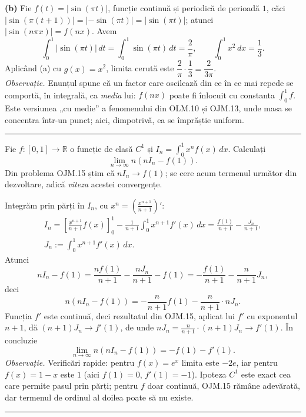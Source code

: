 \noindent\textbf{(b)} Fie $f(t)=|\sin(\pi t)|$, funcție continuă și periodică de
perioadă $1$, căci $|\sin(\pi(t+1))| = |-\sin(\pi t)| = |\sin(\pi t)|$; atunci
$|\sin(n\pi x)| = f(nx)$. Avem
\[ \int_0^1|\sin(\pi t)|\,dt = \int_0^1\sin(\pi t)\,dt = \frac{2}{\pi},
\qquad \int_0^1 x^2\,dx = \frac13 . \]
Aplicând (a) cu $g(x)=x^2$, limita cerută este
$\dfrac{2}{\pi}\cdot\dfrac13 = \dfrac{2}{3\pi}$.\\[2pt]
\emph{Observație.} Enunțul spune că un factor care oscilează din ce în ce mai
repede se comportă, în integrală, ca \emph{media} lui: $f(nx)$ poate fi înlocuit cu
constanta $\int_0^1 f$. Este versiunea „cu medie'' a fenomenului din OLM.10 și
OJM.13, unde masa se concentra într-un punct; aici, dimpotrivă, ea se împrăștie
uniform.
\vspace{1mm}\hrule

Fie $f:[0,1]\to\mathbb{R}$ o funcție de clasă $C^1$ și
$\displaystyle I_n=\int_0^1 x^n f(x)\,dx$. Calculați
\[ \lim_{n\to\infty} n\left(n I_n - f(1)\right). \]
\sol Din problema OJM.15 știm că $nI_n\to f(1)$; se cere acum termenul următor din
dezvoltare, adică \emph{viteza} acestei convergențe.

Integrăm prin părți în $I_n$, cu $x^n = \left(\frac{x^{n+1}}{n+1}\right)'$:
\[ \begin{gathered} I_n = \left[\frac{x^{n+1}}{n+1}f(x)\right]_0^1 - \frac{1}{n+1}\int_0^1 x^{n+1}f'(x)\,dx
= \frac{f(1)}{n+1} - \frac{J_n}{n+1},\\
J_n := \int_0^1 x^{n+1}f'(x)\,dx . \end{gathered} \]
Atunci
\[ n I_n - f(1) = \frac{n f(1)}{n+1} - \frac{n J_n}{n+1} - f(1)
= -\frac{f(1)}{n+1} - \frac{n}{n+1}J_n , \]
deci
\[ n\left(n I_n - f(1)\right) = -\frac{n}{n+1}f(1) - \frac{n}{n+1}\cdot n J_n . \]
Funcția $f'$ este continuă, deci rezultatul din OJM.15, aplicat lui $f'$ cu
exponentul $n+1$, dă $(n+1)J_n \to f'(1)$, de unde
$nJ_n = \frac{n}{n+1}\cdot (n+1)J_n \to f'(1)$. În concluzie
\[ \lim_{n\to\infty} n\left(n I_n - f(1)\right) = -f(1)-f'(1) . \]
\emph{Observație.} Verificări rapide: pentru $f(x)=e^x$ limita este $-2e$, iar
pentru $f(x)=1-x$ este $1$ (aici $f(1)=0$, $f'(1)=-1$). Ipoteza $C^1$ este exact
cea care permite pasul prin părți; pentru $f$ doar continuă, OJM.15 rămâne
adevărată, dar termenul de ordinul al doilea poate să nu existe.
\vspace{1mm}\hrule

